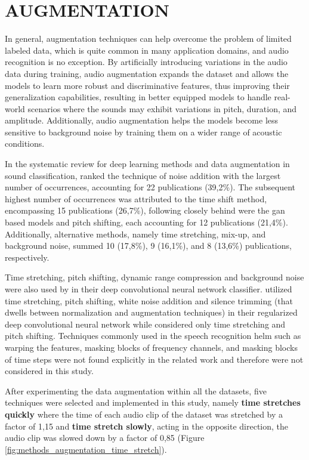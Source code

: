 \section{AUGMENTATION}
\label{sec:methods_augmentation}

In general, augmentation techniques can help overcome the problem of limited labeled data, which is quite common in many application domains, and audio recognition is no exception. By artificially introducing variations in the audio data during training, audio augmentation expands the dataset and allows the models to learn more robust and discriminative features, thus improving their generalization capabilities, resulting in better equipped models to handle real-world scenarios where the sounds may exhibit variations in pitch, duration, and amplitude. Additionally, audio augmentation helps the models become less sensitive to background noise by training them on a wider range of acoustic conditions.

In the systematic review for deep learning methods and data augmentation in sound classification, \textcite{Alli2022} ranked the technique of noise addition with the largest number of occurrences, accounting for 22 publications (39,2\%). The subsequent highest number of occurrences was attributed to the time shift method, encompassing 15 publications (26,7\%), following closely behind were the \gls{gan} based models and pitch shifting, each accounting for 12 publications (21,4\%). Additionally, alternative methods, namely time stretching, mix-up, and background noise, summed 10 (17,8\%), 9 (16,1\%), and 8 (13,6\%) publications, respectively. 

 Time stretching, pitch shifting, dynamic range compression and background noise were also used by \textcite{Salamon2017} in their deep convolutional neural network classifier. \textcite{Mmushtaq2020} utilized time stretching, pitch shifting, white noise addition and silence trimming (that dwells between normalization and augmentation techniques) in their regularized deep convolutional neural network while \textcite{Bountourakis2019} considered only time stretching and pitch shifting. Techniques commonly used in the speech recognition helm such as warping the features, masking blocks of frequency channels, and masking blocks of time steps \cite{Park2019} were not found explicitly in the related work and therefore were not considered in this study.

After experimenting the data augmentation within all the datasets, five techniques were selected and implemented in this study, namely \textbf{time stretches quickly} where the time of each audio clip of the dataset was stretched by a factor of 1,15 and \textbf{time stretch slowly}, acting in the opposite direction, the audio clip was slowed down by a factor of 0,85 (Figure \ref{fig:methods_augmentation_time_stretch}).

